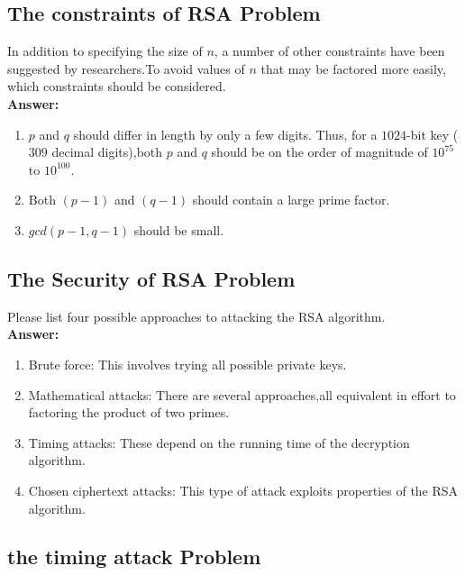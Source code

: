 \documentclass[paper=a4, fontsize=11pt]{scrartcl} %
\numberwithin{equation}{section} %
\numberwithin{figure}{section} %
\numberwithin{table}{section} %
\begin{document}
 \subsection{The constraints of RSA Problem \uppercase\expandafter{}}

 In addition to specifying the size of $n$, a number of other constraints have been suggested by researchers.To avoid values of $n$ that may be factored more easily, which constraints should be considered.\\

 \textbf{Answer:}

 \begin{enumerate}
  \item $p$ and $q$ should differ in length by only a few digits. Thus, for a $1024$-bit key ($309$ decimal digits),both $p$ and $q$ should be on the order of magnitude of $10^{75}$ to $10^{100}$.
  \item Both $(p - 1)$ and $(q - 1)$ should contain a large prime factor.
  \item $gcd(p - 1,q - 1)$ should be small.
 \end{enumerate}


 \subsection{The Security of RSA Problem \uppercase\expandafter{}}

 Please list four possible approaches to attacking the RSA algorithm.\\

 \textbf{Answer:}

 \begin{enumerate}
 \item Brute force: This involves trying all possible private keys.
 \item Mathematical attacks: There are several approaches,all equivalent in effort to factoring the product of two primes.
 \item Timing attacks: These depend on the running time of the decryption algorithm.
 \item Chosen ciphertext attacks: This type of attack exploits properties of the RSA algorithm.
 \end{enumerate}

 \subsection{the timing attack Problem \uppercase\expandafter{}}
\end{document}
